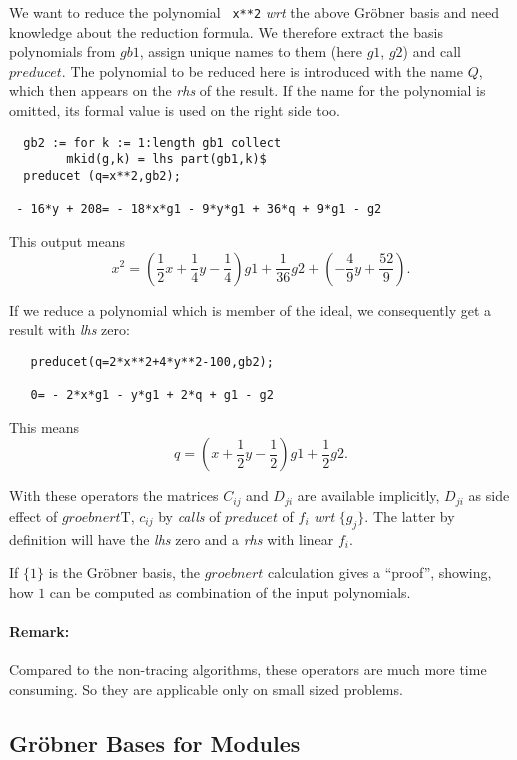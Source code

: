 We want to reduce the polynomial \verb+ x**2+ {\it  wrt}
the above Gr\"obner basis and need knowledge about the reduction
formula. We therefore extract the basis polynomials from $gb1$,
assign unique names to them (here $g1$, $g2$) and call $preducet$.
The polynomial to be reduced here is introduced with the name $Q$,
which then appears on the {\it rhs} of the result. If the name for the
polynomial is omitted, its formal value is used on the right side too.

\begin{verbatim}
  gb2 := for k := 1:length gb1 collect
        mkid(g,k) = lhs part(gb1,k)$
  preducet (q=x**2,gb2);

 - 16*y + 208= - 18*x*g1 - 9*y*g1 + 36*q + 9*g1 - g2
\end{verbatim}

This output means
\[
x^2 = (\frac{1}{2} x + \frac{1}{4} y - \frac{1}{4}) g1
 + \frac{1}{36} g2 + (-\frac{4}{9} y + \frac{52}{9}).
\]


\example {}

If we reduce a polynomial which is member of the ideal, we
consequently get a result with {\it lhs} zero:
\begin{verbatim}
   preducet(q=2*x**2+4*y**2-100,gb2);

   0= - 2*x*g1 - y*g1 + 2*q + g1 - g2
\end{verbatim}

This means
\[ q = ( x + \frac{1}{2} y - \frac{1}{2}) g1 + \frac{1}{2} g2.
\]

With these operators the matrices $C_{ij}$ and $D_{ji}$ are available
implicitly, $D_{ji}$ as side effect of $groebnert$T, $c_{ij}$ by {\it calls}
of $preducet$ of $f_i$ {\it wrt} $\{g_j\}$. The latter by definition will
have the {\it lhs} zero and a {\it rhs} with linear $f_i$.

If $\{1\}$ is the Gr\"obner basis, the $groebnert$ calculation gives
a ``proof'', showing,  how  $1$ can be computed as combination of the
input polynomials.

\paragraph{Remark:} Compared to the non-tracing algorithms, these
operators are much more time consuming. So they are applicable
only on small sized problems.

\subsection{Gr\"obner Bases for Modules}

